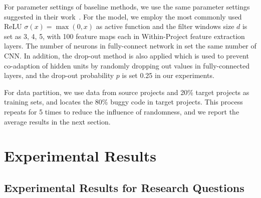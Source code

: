 For parameter settings of baseline methods, we use the same parameter settings suggested in their work~\cite{rao2011retrieval}. For the \TRANPCNN model, we employ the most commonly used ReLU $\sigma(x)=\max(0,x)$ as active function and the filter windows size $d$ is set as 3, 4, 5, with 100 feature maps each in Within-Project feature extraction layers. The number of neurons in fully-connect network in  set the same number of CNN. In addition, the drop-out method is also applied which is used to prevent co-adaption of hidden units by randomly dropping out values in fully-connected layers, and the drop-out probability $p$ is set 0.25 in our experiments.

For data partition, we use data from source projects and 20\% target projects as training sets, and locates the 80\% buggy code in target projects. This process repeats for 5 times to reduce the influence of randomness, and we report the average results in the next section.

\section{Experimental Results}

\subsection{Experimental Results for Research Questions}

